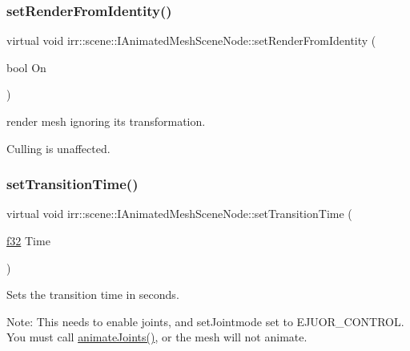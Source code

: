 \subsubsection{\texorpdfstring{set\+Render\+From\+Identity()}{setRenderFromIdentity()}\hspace{0.1cm}{\footnotesize\ttfamily [2/2]}}
{\footnotesize\ttfamily virtual void irr\+::scene\+::\+I\+Animated\+Mesh\+Scene\+Node\+::set\+Render\+From\+Identity (\begin{DoxyParamCaption}\item[{bool}]{On }\end{DoxyParamCaption})\hspace{0.3cm}{\ttfamily [pure virtual]}}



render mesh ignoring its transformation. 

Culling is unaffected. \mbox{\label{classirr_1_1scene_1_1IAnimatedMeshSceneNode_a424d2dc577842949094a9d8c2a3eba0e}} 
\subsubsection{\texorpdfstring{set\+Transition\+Time()}{setTransitionTime()}\hspace{0.1cm}{\footnotesize\ttfamily [1/2]}}
{\footnotesize\ttfamily virtual void irr\+::scene\+::\+I\+Animated\+Mesh\+Scene\+Node\+::set\+Transition\+Time (\begin{DoxyParamCaption}\item[{\hyperlink{namespaceirr_a0277be98d67dc26ff93b1a6a1d086b07}{f32}}]{Time }\end{DoxyParamCaption})\hspace{0.3cm}{\ttfamily [pure virtual]}}



Sets the transition time in seconds. 

Note\+: This needs to enable joints, and set\+Jointmode set to E\+J\+U\+O\+R\+\_\+\+C\+O\+N\+T\+R\+OL. You must call \hyperlink{classirr_1_1scene_1_1IAnimatedMeshSceneNode_a76af2c9a2b0cea6ee2b3559c1f32f850}{animate\+Joints()}, or the mesh will not animate. \mbox{\label{classirr_1_1scene_1_1IAnimatedMeshSceneNode_a424d2dc577842949094a9d8c2a3eba0e}} 
